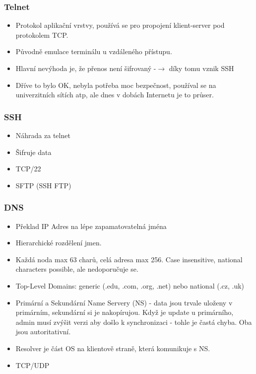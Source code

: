 \documentclass[10pt,a4paper]{article}
\begin{document}
\subsubsection{Telnet}
\begin{itemize}
\item Protokol aplikační vrstvy, používá se pro propojení klient-server pod protokolem TCP.
\item Původně emulace terminálu u vzdáleného přístupu.
\item Hlavní nevýhoda je, že přenos není šifrovaný -$\rightarrow$ díky tomu vznik SSH
\item Dříve to bylo OK, nebyla potřeba moc bezpečnost, používal se na univerzitních sítích atp, ale dnes v dobách Internetu je to průser.
\end{itemize}

\subsubsection{SSH}
\begin{itemize}
\item Náhrada za telnet
\item Šifruje data
\item TCP/22
\item SFTP (SSH FTP)
\end{itemize}

\subsubsection{DNS}
\begin{itemize}
\item Překlad IP Adres na lépe zapamatovatelná jména
\item Hierarchické rozdělení jmen.
\item Každá noda max 63 charů, celá adresa max 256. Case insensitive, national characters possible, ale nedoporučuje se.
\item Top-Level Domains: generic (.edu, .com, .org, .net) nebo national (.cz, .uk)
\item Primární a Sekundární Name Servery (NS) - data jsou trvale uloženy v primárním, sekundární si je nakopírujou. Když je update u primárního, admin musí zvýšit verzi aby došlo k synchronizaci - tohle je častá chyba. Oba jsou autoritativní.
\item Resolver je část OS na klientově straně, která komunikuje s NS.
\item TCP/UDP
\end{itemize}
\end{document}
